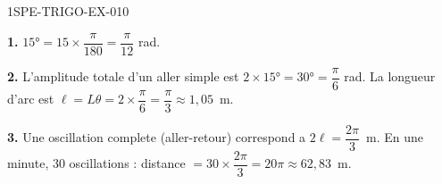 \begin{corrige}{1SPE-TRIGO-EX-010}

\textbf{1.} $15° = 15 \times \dfrac{\pi}{180} = \dfrac{\pi}{12}$ rad.

\textbf{2.} L'amplitude totale d'un aller simple est $2 \times 15° = 30° = \dfrac{\pi}{6}$ rad. La longueur d'arc est $\ell = L\theta = 2 \times \dfrac{\pi}{6} = \dfrac{\pi}{3} \approx 1{,}05$~m.

\textbf{3.} Une oscillation complete (aller-retour) correspond a $2\ell = \dfrac{2\pi}{3}$~m. En une minute, $30$ oscillations : distance $= 30 \times \dfrac{2\pi}{3} = 20\pi \approx 62{,}83$~m.

\end{corrige}
